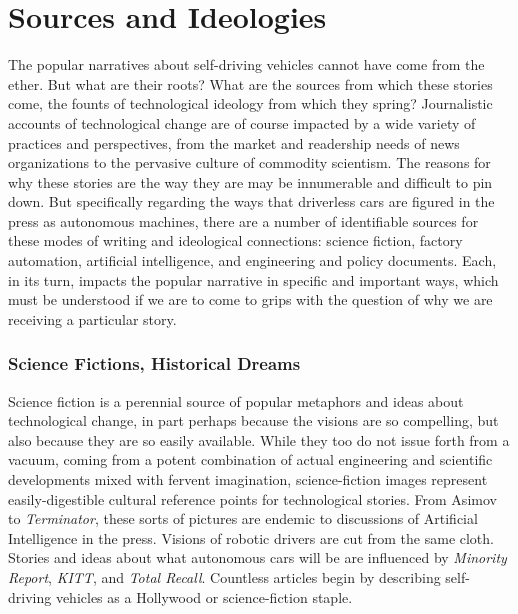 \chapter{Sources and Ideologies}


The popular narratives about self-driving vehicles cannot have come from
the ether. But what are their roots? What are the sources from which
these stories come, the founts of technological ideology from which
they spring? Journalistic accounts of technological change are of
course impacted by a wide variety of practices and perspectives, from
the market and readership needs of news organizations to the pervasive
culture of commodity scientism.\cite{???-smithCommodityScientism} The
reasons for why these stories are the way they are may be innumerable
and difficult to pin down. But specifically regarding the ways that
driverless cars are figured in the press as autonomous machines, there
are a number of identifiable sources for these modes of writing and
ideological connections: science fiction, factory automation,
artificial intelligence, and engineering and policy documents. Each,
in its turn, impacts the popular narrative in specific and important
ways, which must be understood if we are to come to grips with the
question of why we are receiving a particular story.

\subsection{Science Fictions, Historical Dreams}

Science fiction is a perennial source of popular metaphors and ideas
about technological change, in part perhaps because the visions are so
compelling, but also because they are so easily available. While they
too do not issue forth from a vacuum, coming from a potent combination
of actual engineering and scientific developments mixed with fervent imagination,
science-fiction images represent easily-digestible cultural reference
points for technological stories. From Asimov to \emph{Terminator},
these sorts of pictures are endemic to discussions of Artificial
Intelligence in the press. Visions of robotic drivers are cut from the
same cloth. Stories and ideas about what autonomous cars will be are
influenced by \emph{Minority Report}, \emph{KITT}, and \emph{Total
  Recall}.\cite{???} Countless articles begin by describing
self-driving vehicles as a Hollywood or science-fiction
staple.\cite{???-http://seekingalpha.com/article/2798325-a-window-into-a-driverless-future-from-science-fiction-to-reality} 

